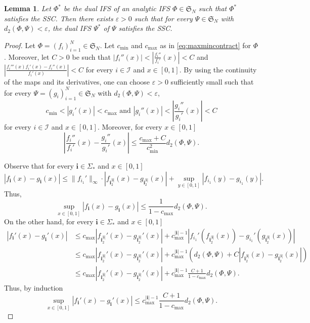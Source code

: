 \documentclass[11pt,]{article}
\def\cref#1{\ref{#1}}%
\newtheorem{lemma}[theorem]{Lemma}
\theoremstyle{definition}
\theoremstyle{remark}
\newcommand{\0}{\mathbf{0}}
\newcommand{\bi}{\mathbf{i}}
\begin{document}
\begin{lemma}\label{lem:cont}
	Let $\Phi^*$ be the dual IFS of an analytic IFS $\Phi\in\mathfrak{S}_N$ such that $\Phi^*$ satisfies the SSC. Then there exists $\varepsilon>0$ such that for every $\Psi\in\mathfrak{S}_N$ with $d_2(\Phi,\Psi)<\varepsilon$, the dual IFS $\Psi^*$ of $\Psi$ satisfies the SSC.
\end{lemma}

\begin{proof}
	Let $\Phi=(f_i)_{i=1}^N\in\mathfrak{S}_N$. Let $c_{\min}$ and $c_{\max}$ as in \cref{eq:maxmincontract} for $\Phi$. Moreover, let $C>0$ be such that $|f_i''(x)|<\left|\frac{f_i''}{f_i'}(x)\right|<C$ and $\left|\frac{f_i'''(x)f_i'(x)-f_i''(x)}{f_i'(x)}\right|<C$ for every $i\in\mathcal{I}$ and $x\in[0,1]$. By using the continuity of the maps and its derivatives, one can choose $\varepsilon>0$ sufficiently small such that for every $\Psi=(g_i)_{i=1}^N\in\mathfrak{S}_N$ with $d_2(\Phi,\Psi)<\varepsilon$, 
	$$
	c_{\min}<|g_i'(x)|<c_{\max}\text{ and } |g_i''(x)|<\left|\frac{g_i''}{g_i'}(x)\right|<C
	$$
	for every $i\in\mathcal{I}$ and $x\in[0,1]$. Moreover, for every $x\in[0,1]$
	\begin{equation}\label{eq:tec1}
	\left|\frac{f_i''}{f_i'}(x)-\frac{g_i''}{g_i'}(x)\right|\leq \frac{c_{\max}+C}{c_{\min}^{2}}d_2(\Phi,\Psi).
	\end{equation}
	
	Observe that for every $\bi\in\Sigma_*$ and $x\in[0,1]$
	$$
	|f_{\bi}(x)-g_{\bi}(x)|\leq\|f_{i_1}'\|_{\infty}\cdot|f_{\bi_2^{|\bi|}}(x)-g_{\bi_2^{|\bi|}}(x)|+\sup_{y\in[0,1]}|f_{i_1}(y)-g_{i_1}(y)|.
	$$ 
	Thus,
	\begin{equation}\label{eq:tec2}
		\sup_{x\in[0,1]}|f_{\bi}(x)-g_{\bi}(x)|\leq \frac{1}{1-c_{\max}}d_2(\Phi,\Psi).
	\end{equation}
	On the other hand, for every $\bi\in\Sigma_*$ and $x\in[0,1]$
	\begin{align*}
	|f_{\bi}'(x)-g_{\bi}'(x)|&\leq c_{\max}|f_{\bi_2^{|\bi|}}'(x)-g_{\bi_2^{|\bi|}}'(x)|+c_{\max}^{|\bi|-1}|f_{i_1}'(f_{\bi_2^{|\bi|}}(x))-g_{i_1}'(g_{\bi_2^{|\bi|}}(x))|\\
	&\leq c_{\max}|f_{\bi_2^{|\bi|}}'(x)-g_{\bi_2^{|\bi|}}'(x)|+c_{\max}^{|\bi|-1}\left(d_2(\Phi,\Psi)+C|f_{\bi_2^{|\bi|}}(x)-g_{\bi_2^{|\bi|}}(x)|\right)\\
	&\leq c_{\max}|f_{\bi_2^{|\bi|}}'(x)-g_{\bi_2^{|\bi|}}'(x)|+c_{\max}^{|\bi|-1}\frac{C+1}{1-c_{\max}}d_2(\Phi,\Psi).
	\end{align*}
	Thus, by induction
	\begin{equation}\label{eq:tec3}
	\sup_{x\in[0,1]}|f_{\bi}'(x)-g_{\bi}'(x)|\leq c_{\max}^{|\bi|-1}\frac{C+1}{1-c_{\max}}d_2(\Phi,\Psi).
	\end{equation}
	

\end{proof}
\end{document}
